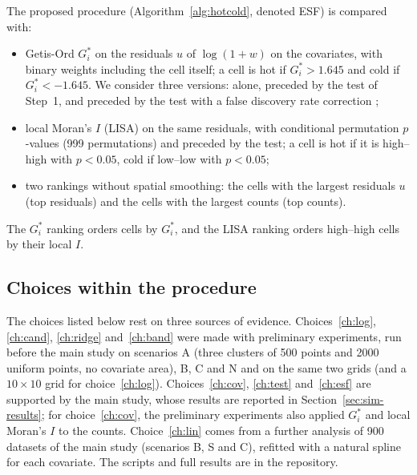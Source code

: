 The proposed procedure (Algorithm~\ref{alg:hotcold}, denoted ESF) is compared with:
\begin{itemize}
  \item Getis-Ord $G_i^*$ \citep{getis1992analysis,ord1995local} on the residuals $u$ of $\log(1+w)$ on the covariates, with binary weights including the cell itself; a cell is hot if $G_i^*>1.645$ and cold if $G_i^*<-1.645$. We consider three versions: alone, preceded by the test of Step~1, and preceded by the test with a false discovery rate correction \citep{benjamini1995controlling};
  \item local Moran's $I$ (LISA) \citep{anselin1995local} on the same residuals, with conditional permutation $p$-values (999 permutations) and preceded by the test; a cell is hot if it is high--high with $p<0.05$, cold if low--low with $p<0.05$;
  \item two rankings without spatial smoothing: the cells with the largest residuals $u$ (top residuals) and the cells with the largest counts (top counts).
\end{itemize}
The $G_i^*$ ranking orders cells by $G_i^*$, and the LISA ranking orders high--high cells by their local $I$.





\subsection{Choices within the procedure}\label{sec:sim-choices}

The choices listed below rest on three sources of evidence. Choices~\ref{ch:log}, \ref{ch:cand}, \ref{ch:ridge} and~\ref{ch:band} were made with preliminary experiments, run before the main study on scenarios A (three clusters of 500 points and 2000 uniform points, no covariate area), B, C and N and on the same two grids (and a $10\times10$ grid for choice~\ref{ch:log}). Choices~\ref{ch:cov}, \ref{ch:test} and~\ref{ch:esf} are supported by the main study, whose results are reported in Section~\ref{sec:sim-results}; for choice~\ref{ch:cov}, the preliminary experiments also applied $G_i^*$ and local Moran's $I$ to the counts. Choice~\ref{ch:lin} comes from a further analysis of 900 datasets of the main study (scenarios B, S and C), refitted with a natural spline for each covariate. The scripts and full results are in the repository.

